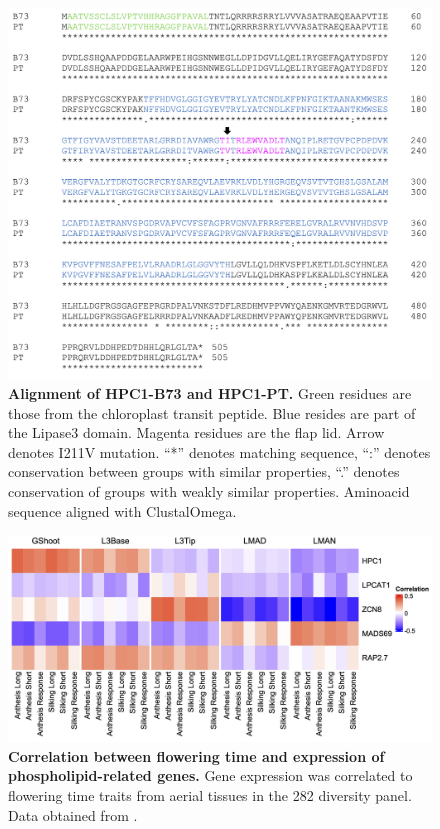 \begin{subappendices}
\begin{figure}[t]
\begin{center}
\includegraphics[width=\linewidth]{Sup_Figures/Sup_Fig_10.png}
\caption[Alignment of HPC1-B73 and HPC1-PT.]
{\textbf{Alignment of HPC1-B73 and HPC1-PT.}
Green residues are those from the chloroplast transit peptide.
Blue resides are part of the Lipase3 domain. 
Magenta residues are the flap lid. 
Arrow denotes I211V mutation. “*” denotes matching sequence, “:” denotes conservation between groups with similar properties, “.” denotes conservation of groups with weakly similar properties.
Aminoacid sequence aligned with ClustalOmega.}
\label{figure:Sup:aa_alignment}
\end{center}
\end{figure} 
\clearpage

\begin{figure}[t]
\begin{center}
\includegraphics[width=\linewidth]{Sup_Figures/Sup_Fig_11.png}
\caption[Correlation between flowering time and expression of phospholipid-related genes.]
{\textbf{Correlation between flowering time and expression of phospholipid-related genes.} 
Gene expression was correlated to flowering time traits from aerial tissues in the 282 diversity panel. 
Data obtained from \citep{kremling2018-gn}.}
\label{figure:Sup:cor_heatmap}
\end{center}
\end{figure} 
\clearpage


\end{subappendices}
